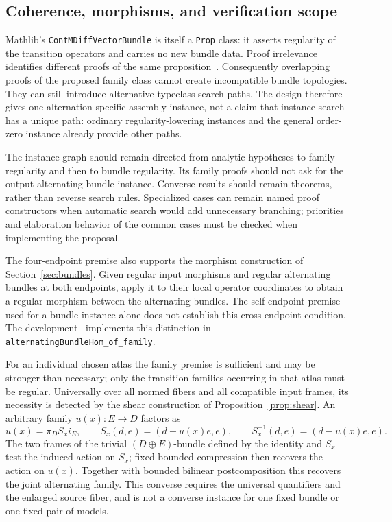 \documentclass[11pt]{amsart}
\theoremstyle{definition}
\theoremstyle{remark}
\numberwithin{equation}{section}
\begin{document}
\subsection{Coherence, morphisms, and verification scope}\label{sec:coherence}

Mathlib's \texttt{ContMDiffVectorBundle} is itself a \texttt{Prop} class: it asserts regularity of
the transition operators and carries no new bundle data. Proof irrelevance identifies different
proofs of the same proposition~\cite{LeanRef}. Consequently overlapping proofs of the proposed
family class cannot create incompatible bundle topologies. They can still introduce alternative
typeclass-search paths. The design therefore gives one alternation-specific assembly instance,
not a claim that instance search has a unique path: ordinary regularity-lowering instances and
the general order-zero instance already provide other paths.

The instance graph should remain directed from analytic hypotheses to family regularity and then
to bundle regularity. Its family proofs should not ask for the output alternating-bundle instance.
Converse results should remain theorems, rather than reverse search rules. Specialized cases can
remain named proof constructors when automatic search would add unnecessary branching; priorities
and elaboration behavior of the common cases must be checked when implementing the proposal.

The four-endpoint premise also supports the morphism construction of
Section~\ref{sec:bundles}. Given regular input morphisms and regular alternating bundles at both
endpoints, apply it to their local operator coordinates to obtain a regular morphism between the
alternating bundles. The self-endpoint premise used for a bundle instance alone does not establish
this cross-endpoint condition. The development~\cite{LeanP} implements this distinction in
\texttt{alternatingBundleHom\_\allowbreak of\_\allowbreak family}.

For an individual chosen atlas the family premise is sufficient and may be stronger than
necessary; only the transition families occurring in that atlas must be regular. Universally
over all normed fibers and all compatible input frames, its necessity is detected by the shear
construction of Proposition~\ref{prop:shear}. An arbitrary family $u(x)\colon E\to D$ factors as
\[
 u(x)=\pi_D S_x i_E,\qquad
 S_x(d,e)=(d+u(x)e,e),\qquad S_x^{-1}(d,e)=(d-u(x)e,e).
\]
The two frames of the trivial $(D\oplus E)$-bundle defined by the identity and $S_x$ test the induced
action on $S_x$; fixed bounded compression then recovers the action on $u(x)$. Together with bounded
bilinear postcomposition this recovers the joint alternating family. This converse requires the
universal quantifiers and the enlarged source fiber, and is not a converse instance for one fixed
bundle or one fixed pair of models.
\end{document}
